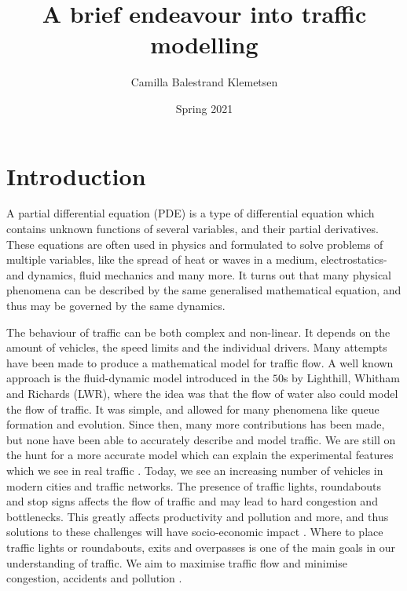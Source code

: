 \documentclass{article}
\title{A brief endeavour into traffic modelling}
\author{Camilla Balestrand Klemetsen}
\date{Spring 2021}
\numberwithin{equation}{section}
\begin{document}
\maketitle
\newpage
{}


\tableofcontents 

\newpage
{}

\section{Introduction}
A partial differential equation (PDE) is a type of differential equation which contains unknown functions of several variables, and their partial derivatives. These equations are often used in physics and formulated to solve problems of multiple variables, like the spread of heat or waves in a medium, electrostatics- and dynamics, fluid mechanics and many more. It turns out that many physical phenomena can be described by the same generalised mathematical equation, and thus may be governed by the same dynamics.

The behaviour of traffic can be both complex and non-linear. It depends on the amount of vehicles, the speed limits and the individual drivers. Many attempts have been made to produce a mathematical model for traffic flow. A well known approach is the fluid-dynamic model introduced in the $50$s by Lighthill, Whitham and Richards (LWR), where the idea was that the flow of water also could model the flow of traffic. It was simple, and allowed for many phenomena like queue formation and evolution. Since then, many more contributions has been made, but none have been able to accurately describe and model traffic. We are still on the hunt for a more accurate model which can explain the experimental features which we see in real traffic \cite{KernerHelbing}. Today, we see an increasing number of vehicles in modern cities and traffic networks. The presence of traffic lights, roundabouts and stop signs affects the flow of traffic and may lead to hard congestion and bottlenecks. This greatly affects productivity and pollution and more, and thus solutions to these challenges will have socio-economic impact \cite{GaravelloMauro2006Tfon}. Where to place traffic lights or roundabouts, exits and overpasses is one of the main goals in our understanding of traffic. We aim to maximise traffic flow and minimise congestion, accidents and pollution \cite{GaravelloMauro2006Tfon}. 
\end{document}
